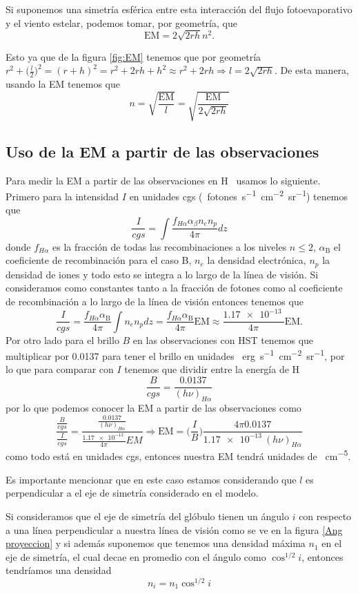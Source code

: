 \documentclass{book}
\begin{document}
Si suponemos una simetría esférica entre esta interacción del flujo fotoevaporativo y el viento estelar, podemos tomar, por geometría, que
\[\mathrm{EM}=2\sqrt{2rh}n^2.\]


Esto ya que de la figura \ref{fig:EM} tenemos que por geometría $r^2+\Big(\frac{l}{2}\Big)^2=(r+h)^2=r^2+2rh+h^2\approx r^2+2rh\Rightarrow l=2\sqrt{2rh}$. De esta manera, usando la EM tenemos que \[n=\sqrt{\frac{\mathrm{EM}}{l}}=\sqrt{\frac{\mathrm{EM}}{2\sqrt{2rh}}}\] 

\subsection{Uso de la EM a partir de las observaciones} \label{Subsec : EM}

Para medir la EM a partir de las observaciones en \unit{H\alpha} usamos lo siguiente. Primero para la intensidad $I$ en unidades cgs (\SI{}{fotones.s^{-1}.cm^{-2}.sr^{-1}}) tenemos que
\[\frac{I}{cgs}=\int \frac{f_{H\alpha}\alpha_\beta n_e n_p}{4\pi}dz\] donde $f_{H\alpha}$ es la fracción de todas las recombinaciones a los niveles $n\le 2$, $\alpha_\mathrm{B}$ el coeficiente de recombinación para el caso B, $n_e$ la densidad electrónica, $n_p$ la densidad de iones y todo esto se integra a lo largo de la línea de visión. Si consideramos como constantes tanto a la fracción de fotones como al coeficiente de recombinación a lo largo de la línea de visión entonces tenemos que
\[\frac{I}{cgs}=\frac{f_{H\alpha}\alpha_\mathrm{B}}{4\pi}\int n_en_pdz=\frac{f_{H\alpha}\alpha_\mathrm{B}}{4\pi} \mathrm{EM} \approx \frac{\SI{1.17e-13}{}}{4\pi}\mathrm{EM}.\]
Por otro lado para el brillo $B$ en las observaciones con  HST tenemos que multiplicar por 0.0137 para tener el brillo en unidades  \SI{}{erg.s^{-1}.cm^{-2}.sr^{-1}}, por lo que para comparar con $I$ tenemos que dividir entre la energía de \unit{H\alpha}
\[\frac{B}{cgs}=\frac{0.0137}{(h\nu)_{\unit{H\alpha}}}\] por lo que podemos conocer la EM a partir de las observaciones como 
\[\frac{\frac{B}{cgs}}{\frac{I}{cgs}}=\frac{\frac{0.0137}{(h\nu)_{\unit{H\alpha}}}}{\frac{\SI{1.17e-13}{}}{4\pi}EM}\Rightarrow \mathrm{EM} = \Big(\frac{I}{B}\Big)\frac{4\pi 0.0137}{\SI{1.17e-13}{}(h\nu)_{\unit{H\alpha}}}\] como todo está en unidades cgs, entonces nuestra EM tendrá unidades de \SI{}{cm^{-5}}.

Es importante mencionar que en este caso estamos considerando que $l$ es perpendicular a el eje de simetría considerado en el modelo. 

Si consideramos que el eje de simetría del glóbulo tienen un ángulo $i$ con respecto a una línea perpendicular a nuestra línea de visión como se ve en la figura \ref{Ang proyeccion} y si además  suponemos que tenemos una densidad máxima $n_1$ en el eje de simetría, el cual decae en promedio con el ángulo como $\cos^{1/2} i$, entonces tendríamos  una densidad \[n_i = n_1\cos^{1/2} i\]
\end{document}
